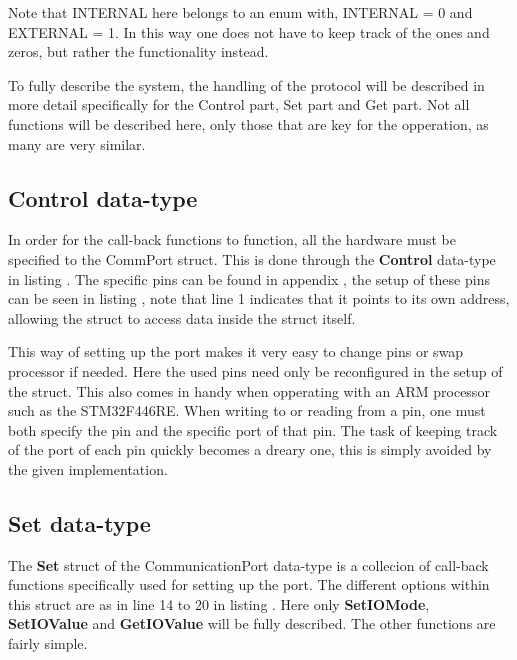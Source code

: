 Note that INTERNAL here belongs to an enum with, INTERNAL = 0 and EXTERNAL = 1. In this way one does not have to keep track of the ones and zeros, but rather the functionality instead.

To fully describe the system, the handling of the protocol will be described in more detail specifically for the Control part, Set part and Get part. Not all functions will be described here, only those that are key for the opperation, as many are very similar.

\subsection*{Control data-type}
In order for the call-back functions to function, all the hardware must be specified to the CommPort struct. This is done through the \textbf{Control} data-type in listing . The specific pins can be found in appendix , the setup of these pins can be seen in listing , note that line 1 indicates that it points to its own address, allowing the struct to access data inside the struct itself.



This way of setting up the port makes it very easy to change pins or swap processor if needed. Here the used pins need only be reconfigured in the setup of the struct. This also comes in handy when opperating with an ARM processor such as the STM32F446RE. When writing to or reading from a pin, one must both specify the pin and the specific port of that pin. The task of keeping track of the port of each pin quickly becomes a dreary one, this is simply avoided by the given implementation.


\subsection*{Set data-type}
The \textbf{Set} struct of the CommunicationPort data-type is a collecion of call-back functions specifically used for setting up the port. The different options within this struct are as in line 14 to 20 in listing . Here only \textbf{SetIOMode}, \textbf{SetIOValue} and \textbf{GetIOValue} will be fully described. The other functions are fairly simple.

